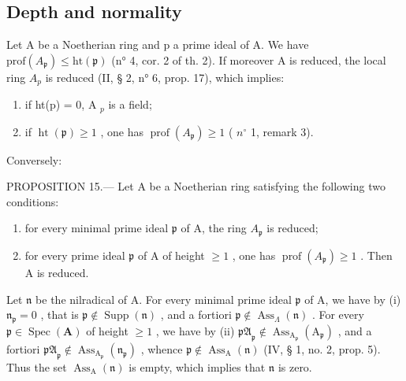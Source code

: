\subsection{Depth and normality}

Let A be a Noetherian ring and p a prime ideal of A. We have \(\text{prof}(A_{\mathfrak{p}}) \leqslant \text{ht}(\mathfrak{p})\) (n° 4, cor. 2 of th. 2). If moreover A is reduced, the local ring \(A_{p}\) is reduced (II, § 2, n° 6, prop. 17), which implies:

\begin{enumerate}
\def\labelenumi{\alph{enumi})}
\item
  if ht(p) = 0, A \(_{p}\) is a field;
\item
  if \(\operatorname{ht}(\mathfrak{p}) \geqslant 1\) , one has \(\operatorname{prof}(A_{\mathfrak{p}}) \geqslant 1\) ( \(n^{\circ}\) 1, remark 3).
\end{enumerate}

Conversely:

PROPOSITION 15.--- Let A be a Noetherian ring satisfying the following two conditions:

\begin{enumerate}
\def\labelenumi{(\roman{enumi})}
\item
  for every minimal prime ideal \(\mathfrak{p}\) of A, the ring \(A_{\mathfrak{p}}\) is reduced;
\item
  for every prime ideal \(\mathfrak{p}\) of A of height \(\geqslant 1\) , one has \(\operatorname{prof}(A_{\mathfrak{p}}) \geqslant 1\) . Then A is reduced.
\end{enumerate}

Let \(\mathfrak{n}\) be the nilradical of A. For every minimal prime ideal \(\mathfrak{p}\) of A, we have by (i) \(\mathfrak{n}_{\mathfrak{p}} = 0\) , that is \(\mathfrak{p} \notin \operatorname{Supp}(\mathfrak{n})\) , and a fortiori \(\mathfrak{p} \notin \operatorname{Ass}_{\Lambda}(\mathfrak{n})\) . For every \(\mathfrak{p} \in \operatorname{Spec}(\mathbf{A})\) of height \(\geqslant 1\) , we have by (ii) \(\mathfrak{pA}_{\mathfrak{p}} \notin \operatorname{Ass}_{\mathrm{A}_{\mathfrak{p}}}(\mathrm{A}_{\mathfrak{p}})\) , and a fortiori \(\mathfrak{pA}_{\mathfrak{p}} \notin \operatorname{Ass}_{\mathrm{A}_{\mathfrak{p}}}(\mathfrak{n}_{\mathfrak{p}})\) , whence \(\mathfrak{p} \notin \operatorname{Ass}_{\mathrm{A}}(\mathfrak{n})\) (IV, § 1, no. 2, prop. 5). Thus the set \(\operatorname{Ass}_{\mathrm{A}}(\mathfrak{n})\) is empty, which implies that \(\mathfrak{n}\) is zero.

